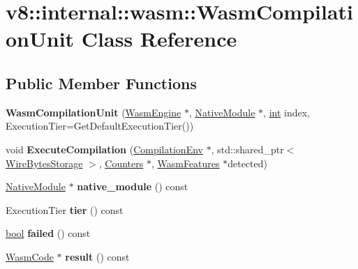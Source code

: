 \hypertarget{classv8_1_1internal_1_1wasm_1_1WasmCompilationUnit}{}\section{v8\+:\+:internal\+:\+:wasm\+:\+:Wasm\+Compilation\+Unit Class Reference}
\label{classv8_1_1internal_1_1wasm_1_1WasmCompilationUnit}
\subsection*{Public Member Functions}
\begin{DoxyCompactItemize}
\item 
\mbox{\label{classv8_1_1internal_1_1wasm_1_1WasmCompilationUnit_a041e0902a178e274e570f73b2b4914f1}} 
{\bfseries Wasm\+Compilation\+Unit} (\mbox{\hyperlink{classv8_1_1internal_1_1wasm_1_1WasmEngine}{Wasm\+Engine}} $\ast$, \mbox{\hyperlink{classv8_1_1internal_1_1wasm_1_1NativeModule}{Native\+Module}} $\ast$, \mbox{\hyperlink{classint}{int}} index, Execution\+Tier=Get\+Default\+Execution\+Tier())
\item 
\mbox{\label{classv8_1_1internal_1_1wasm_1_1WasmCompilationUnit_a5829db8a8b34972574e7c4469a7587c3}} 
void {\bfseries Execute\+Compilation} (\mbox{\hyperlink{structv8_1_1internal_1_1wasm_1_1CompilationEnv}{Compilation\+Env}} $\ast$, std\+::shared\+\_\+ptr$<$ \mbox{\hyperlink{classv8_1_1internal_1_1wasm_1_1WireBytesStorage}{Wire\+Bytes\+Storage}} $>$, \mbox{\hyperlink{classv8_1_1internal_1_1Counters}{Counters}} $\ast$, \mbox{\hyperlink{structv8_1_1internal_1_1wasm_1_1WasmFeatures}{Wasm\+Features}} $\ast$detected)
\item 
\mbox{\label{classv8_1_1internal_1_1wasm_1_1WasmCompilationUnit_aba561486c0b608d9f9c0892e0cb56bc7}} 
\mbox{\hyperlink{classv8_1_1internal_1_1wasm_1_1NativeModule}{Native\+Module}} $\ast$ {\bfseries native\+\_\+module} () const
\item 
\mbox{\label{classv8_1_1internal_1_1wasm_1_1WasmCompilationUnit_a612577dea57ec12822ce26597949be5e}} 
Execution\+Tier {\bfseries tier} () const
\item 
\mbox{\label{classv8_1_1internal_1_1wasm_1_1WasmCompilationUnit_ab217faf8f5d20d8027f5d596d2c287cb}} 
\mbox{\hyperlink{classbool}{bool}} {\bfseries failed} () const
\item 
\mbox{\label{classv8_1_1internal_1_1wasm_1_1WasmCompilationUnit_a23519855746ba9a1c7bb3bddc0007b9e}} 
\mbox{\hyperlink{classv8_1_1internal_1_1wasm_1_1WasmCode}{Wasm\+Code}} $\ast$ {\bfseries result} () const
\end{DoxyCompactItemize}
